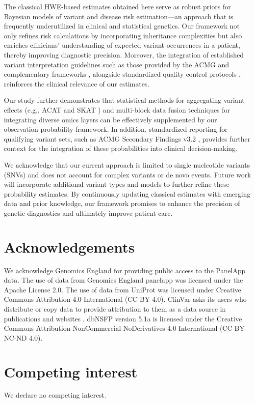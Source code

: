 The classical HWE-based estimates obtained here serve as robust priors for Bayesian models of variant and disease risk estimation—an approach that is frequently underutilized in clinical and statistical genetics. Our framework not only refines risk calculations by incorporating inheritance complexities but also enriches clinicians’ understanding of expected variant occurrences in a patient, thereby improving diagnostic precision. Moreover, the integration of established variant interpretation guidelines such as those provided by the ACMG \citep{richards2015standards} and complementary frameworks \citep{tavtigian2020fitting,li2017intervar}, alongside standardized quality control protocols \citep{pedersen2021effective,anderson2010data}, reinforces the clinical relevance of our estimates.

Our study further demonstrates that statistical methods for aggregating variant effects (e.g., ACAT and SKAT \citep{liu2019acat,li2020dynamic,wu2011rare,lee2012optimal}) and multi-block data fusion techniques for integrating diverse omics layers \citep{kong2018nature,howe2021within} can be effectively supplemented by our observation probability framework. In addition, standardized reporting for qualifying variant sets, such as ACMG Secondary Findings v3.2 \citep{miller2023acmg}, provides further context for the integration of these probabilities into clinical decision-making.

We acknowledge that our current approach is limited to single nucleotide variants (SNVs) and does not account for complex variants or de novo events. Future work will incorporate additional variant types and models to further refine these probability estimates. By continuously updating classical estimates with emerging data and prior knowledge, our framework promises to enhance the precision of genetic diagnostics and ultimately improve patient care.

\section*{Acknowledgements}
\noindent
We acknowledge Genomics England for providing public access to the PanelApp data.
The use of data from Genomics England panelapp was licensed under the Apache License 2.0.
The use of data from UniProt was licensed under Creative Commons Attribution 4.0 International (CC BY 4.0).
ClinVar asks its users who distribute or copy data to provide attribution to them as a data source in publications and websites \cite{landrum_clinvar_2018}.
 dbNSFP version 5.1a is licensed under the Creative Commons Attribution-NonCommercial-NoDerivatives 4.0 International (CC BY-NC-ND 4.0).

\section*{Competing interest}
\noindent
We declare no competing interest. 

\newpage





